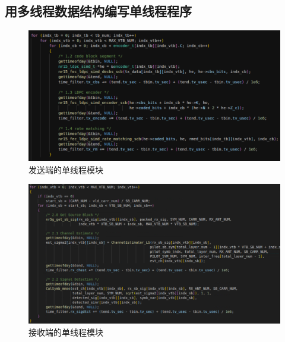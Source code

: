 \documentclass{article}
\begin{document}
\subsection{用多线程数据结构编写单线程程序}
\begin{figure}[H]
	\centering
	\includegraphics[width = \textwidth]{tips.png}
	\caption{发送端的单线程模块}
\end{figure}
\begin{figure}[H]
	\centering
	\includegraphics[width = \textwidth]{tips2.png}
	\caption{接收端的单线程模块}
\end{figure}


\end{document}
